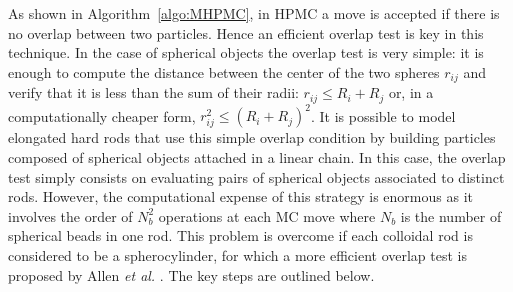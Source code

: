As shown in Algorithm~\ref{algo:MHPMC}, in HPMC a move is accepted if there is no overlap between two particles. Hence an efficient overlap test is key in this technique. In the case of spherical objects the overlap test is very simple: it is enough to compute the distance between the center of the two spheres $r_{ij}$ and verify that it is less than the sum of their radii: $r_{ij} \leqslant R_i + R_j$ or, in a computationally cheaper form, $r_{ij}^2 \leqslant (R_i + R_j)^2$. It is possible to model elongated hard rods that use this simple overlap condition by building particles composed of spherical objects attached in a linear chain. In this case, the overlap test simply consists on evaluating pairs of spherical objects associated to distinct rods. However, the computational expense of this strategy is enormous as it involves the order of $N_b^2$ operations at each MC move where $N_b$ is the number of spherical beads in one rod.
This problem is overcome if each colloidal rod is considered to be a spherocylinder, for which a more efficient overlap test is proposed by Allen {\em et al.} \cite{allenevans}. The key steps are outlined below.

